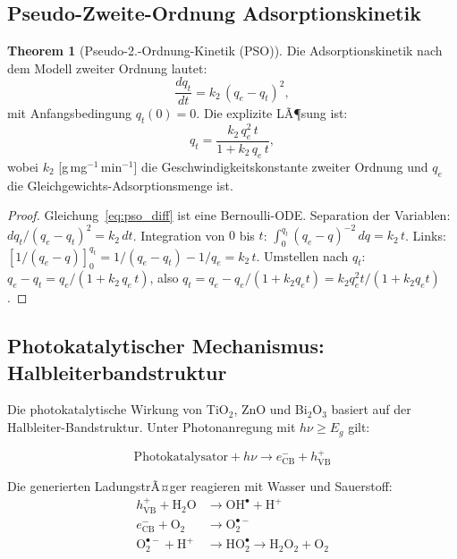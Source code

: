 ﻿\documentclass[12pt,a4paper]{article}
\theoremstyle{definition}
\newtheorem{theorem}{Theorem}[section]
\theoremstyle{remark}
\begin{document}
\subsection{Pseudo-Zweite-Ordnung Adsorptionskinetik}

\begin{theorem}[Pseudo-2.-Ordnung-Kinetik (PSO)]
\label{thm:pso}
Die Adsorptionskinetik nach dem Modell zweiter Ordnung lautet:
\begin{equation}
  \frac{dq_t}{dt} = k_2\,(q_e - q_t)^2,
  \label{eq:pso_diff}
\end{equation}
mit Anfangsbedingung $q_t(0) = 0$. Die explizite LÃ¶sung ist:
\begin{equation}
  q_t = \frac{k_2\,q_e^2\,t}{1 + k_2\,q_e\,t},
  \label{eq:pso_sol}
\end{equation}
wobei $k_2$ [g\,mg$^{-1}$\,min$^{-1}$] die Geschwindigkeitskonstante
zweiter Ordnung und $q_e$ die Gleichgewichts-Adsorptionsmenge ist.
\end{theorem}

\begin{proof}
Gleichung~\eqref{eq:pso_diff} ist eine Bernoulli-ODE. Separation der Variablen:
$dq_t/(q_e-q_t)^2 = k_2\,dt$.
Integration von $0$ bis $t$:
$\int_0^{q_t} (q_e-q)^{-2}\,dq = k_2\,t$.
Links: $[1/(q_e-q)]_0^{q_t} = 1/(q_e-q_t) - 1/q_e = k_2\,t$.
Umstellen nach $q_t$:
$q_e - q_t = q_e/(1 + k_2\,q_e\,t)$, also
$q_t = q_e - q_e/(1+k_2 q_e t) = k_2 q_e^2 t/(1+k_2 q_e t)$.\hfill
\end{proof}

\subsection{Photokatalytischer Mechanismus: Halbleiterbandstruktur}

Die photokatalytische Wirkung von TiO$_2$, ZnO und Bi$_2$O$_3$ basiert auf
der Halbleiter-Bandstruktur. Unter Photonanregung mit $h\nu \geq E_g$ gilt:

\begin{equation}
  \text{Photokatalysator} + h\nu \to e^-_{\text{CB}} + h^+_{\text{VB}}
  \label{eq:photoanregung}
\end{equation}

Die generierten LadungstrÃ¤ger reagieren mit Wasser und Sauerstoff:
\begin{align}
  h^+_{\text{VB}} + \text{H}_2\text{O} &\to \text{OH}^\bullet + \text{H}^+
  \label{eq:oh_radical}\\
  e^-_{\text{CB}} + \text{O}_2 &\to \text{O}_2^{\bullet-}
  \label{eq:superoxid}\\
  \text{O}_2^{\bullet-} + \text{H}^+ &\to \text{HO}_2^\bullet \to \text{H}_2\text{O}_2 + \text{O}_2
  \label{eq:h2o2}
\end{align}
\end{document}
